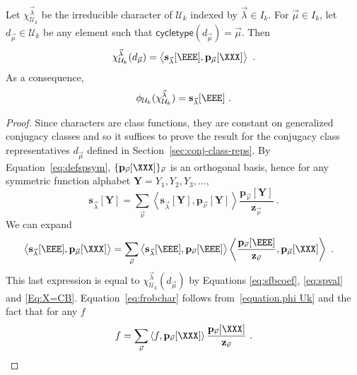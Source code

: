 \begin{theorem}
\label{conj:frobchar}
Let $\chi^{\vec{\lambda}}_{\mathcal{U}_k}$ be the irreducible character of $\mathcal{U}_k$ indexed by $\vec{\lambda}\in I_k$.
For $\vec{\mu} \in I_k$, let $d_{\vec{\mu}} \in \mathcal{U}_k$ be any element
such that $\mathsf{cycletype}(d_{\vec{\mu}}) = \vec{\mu}$. Then
\begin{equation}\label{eq:sfexpr}
\chi^{\vec{\lambda}}_{\mathcal{U}_k}(d_{\vec{\mu}}) = \left< \mathbf{s}_{\vec{\lambda}}[\EEE], \mathbf{p}_{\vec{\mu}}[\XXX] \right>~.
\end{equation}
As a consequence,
\begin{equation}
\label{eq:frobchar}
    \phi_{\mathcal{U}_k}( \chi^{\vec{\lambda}}_{\mathcal{U}_k} )
    = \mathbf{s}_{\vec{\lambda}}[\EEE]~.
\end{equation}
\end{theorem}

\begin{proof}
Since characters are class functions, they are constant on generalized
conjugacy classes and so it suffices to prove the result for the conjugacy
class representatives $d_{\vec{\mu}}$ defined in Section~\ref{sec:conj-class-reps}.
By Equation~\eqref{eq:defspsym}, $\{ \mathbf{p}_{\vec{\nu}}[\XXX] \}_{\vec{\nu}}$
is an orthogonal basis, hence for any symmetric function alphabet $\mathbf{Y} = Y_1, Y_2, Y_3, \ldots$,
$$\mathbf{s}_{\vec{\lambda}}[\mathbf{Y}] = \sum_{\vec{\nu}}
\left< \mathbf{s}_{\vec{\lambda}}[\mathbf{Y}], \mathbf{p}_{\vec{\nu}}[\mathbf{Y}]\right>
\frac{\mathbf{p}_{\vec{\nu}}[\mathbf{Y}]}{\mathbf{z}_{\vec{\nu}}}~.
$$
We can expand
\begin{align}\label{eq:sfversionXeqCB}
\left< \mathbf{s}_{\vec{\lambda}}[\EEE], \mathbf{p}_{\vec{\mu}}[\XXX] \right>&=
\sum_{\vec{\nu}} \left< \mathbf{s}_{\vec{\lambda}}[\EEE],
\mathbf{p}_{\vec{\nu}}[\EEE] \right>
\left< \frac{\mathbf{p}_{\vec{\nu}}[\EEE]}{\mathbf{z}_{\vec{\nu}}},\mathbf{p}_{\vec{\mu}}[\XXX] \right>~.
\end{align}
This last expression is equal to $\chi^{\vec{\lambda}}_{\mathcal{U}_k}(d_{\vec{\mu}})$
by Equations \eqref{eq:sfbcoef}, \eqref{eq:spval} and \eqref{Eq:X=CB}.
Equation~\eqref{eq:frobchar} follows from~\eqref{equation.phi Uk} and the fact that for any $f$
$$f = \sum_{\vec{\nu}} \left< f, \mathbf{p}_{\vec{\nu}}[\XXX]\right>
\frac{\mathbf{p}_{\vec{\nu}}[\XXX]}{\mathbf{z}_{\vec{\nu}}}~.
$$
\end{proof}
